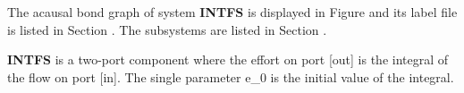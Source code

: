 

   The acausal bond graph of system \textbf{INTFS} is
   displayed in Figure  and its label
   file is listed in Section .
   The subsystems are listed in Section .

\textbf{INTFS} is a two-port component where the effort on port [out]
   is the integral of the flow on port [in]. The single parameter e_0
   is the initial value of the integral.
